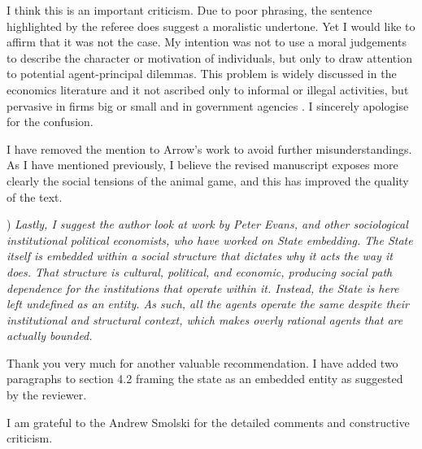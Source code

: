\documentclass[a4paper,12pt]{article}
\begin{document}
\vspace{.25cm}

I think this is an important criticism. Due to poor phrasing, the sentence highlighted by the referee does suggest a moralistic undertone. Yet I would like to affirm that it was not the case. My intention was not to use a moral judgements to describe the character or motivation of individuals, but only to draw attention to potential agent-principal dilemmas. This problem is widely discussed in the economics literature and it not ascribed only to informal or illegal activities, but pervasive in firms big or small and in government agencies \citep[e.g.,][]{grossman1983analysis,laffont2009theory,sappington1991incentives}. I sincerely apologise for the confusion.

I have removed the mention to Arrow's work to avoid further misunderstandings. As I have mentioned previously, I believe the revised manuscript exposes more clearly the social tensions of the animal game, and this has improved the quality of the text. 

\vspace{.5cm}

) \textit{Lastly, I suggest the author look at work by Peter Evans, and other sociological institutional political economists, who have worked on State embedding. The State itself is embedded within a social structure that dictates why it acts the way it does. That structure is cultural, political, and economic, producing social path dependence for the institutions that operate within it. Instead, the State is here left undefined as an entity. As such, all the agents operate the same despite their institutional and structural context, which makes overly rational agents that are actually bounded.}

\vspace{.25cm}

Thank you very much for another valuable recommendation. I have added two paragraphs to section 4.2 framing the state as an embedded entity as suggested by the reviewer. 

\vspace{.5cm}

I am grateful to the Andrew Smolski for the detailed comments and constructive criticism.  


\newpage


\end{document}
